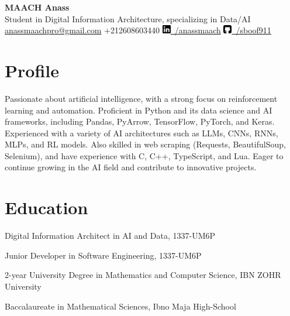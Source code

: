 \documentclass[a4paper,11pt]{article}%
\begin{document}
%
\normalsize%
\begin{center}%
{\Huge \textbf{MAACH Anass}}\\[0.3em]%
Student in Digital Information Architecture, specializing in Data/AI\\[0.3em]%
\href{mailto:anassmaachpro@gmail.com}{anassmaachpro@gmail.com}%
 \quad +212608603440 \quad %
\href{https://www.linkedin.com/in/anassmaach}{\includegraphics[height=1em]{icons/linkedin.png}~/anassmaach} \quad %
\href{https://github.com/sboof911}{\includegraphics[height=1em]{icons/github.png}~/sboof911}%
\end{center}%
\section*{Profile}%
Passionate about artificial intelligence, with a strong focus on reinforcement learning and automation. Proficient in Python and its data science and AI frameworks, including Pandas, PyArrow, TensorFlow, PyTorch, and Keras.  \newline Experienced with a variety of AI architectures such as LLMs, CNNs, RNNs, MLPs, and RL models.  \newline \newline Also skilled in web scraping (Requests, BeautifulSoup, Selenium), and have experience with C, C++, TypeScript, and Lua.  \newline Eager to continue growing in the AI field and contribute to innovative projects.%
\section*{Education}%
\noindent{}\begin{minipage}[t]{\dimexpr\linewidth-3.5cm\relax}Digital Information Architect in AI and Data, 1337-UM6P\end{minipage}\par%
\noindent{}\begin{minipage}[t]{\dimexpr\linewidth-3.5cm\relax}Junior Developer in Software Engineering, 1337-UM6P\end{minipage}\par%
\noindent{}\begin{minipage}[t]{\dimexpr\linewidth-3.5cm\relax}2-year University Degree in Mathematics and Computer Science, IBN ZOHR University\end{minipage}\par%
\noindent{}\begin{minipage}[t]{\dimexpr\linewidth-3.5cm\relax}Baccalaureate in Mathematical Sciences, Ibno Maja High-School\end{minipage}\par%
\end{document}
